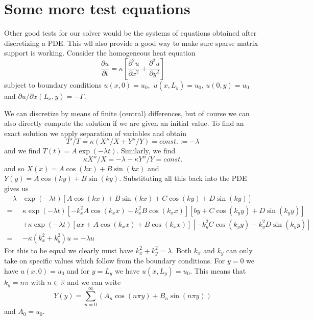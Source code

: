 \documentclass[10pt,a4paper]{article}
\begin{document}
\section{Some more test equations}
Other good tests for our solver would be the systems of equations obtained after discretizing a PDE. This wll also provide a good way to make sure sparse matrix support is working.
Consider the homogeneous heat equation
\begin{equation*}
  \frac{\partial u}{\partial t} = \kappa \left[ \frac{\partial^2u}{\partial x^2} + \frac{\partial^2 u}{\partial y^2}\right]
\end{equation*}
subject to boundary conditions $u(x, 0) = u_0,$ $u(x, L_y)=u_0$, $u(0, y) = u_0$ and $\partial u/\partial x(L_x, y) = -\Gamma.$

We can discretize by means of finite (central) differences, but of course we can also directly compute the solution if we are given an initial value.
To find an exact solution we apply separation of variables and obtain
\begin{equation*}
  T'/T = \kappa (X''/X + Y''/Y) = const. := -\lambda
\end{equation*}
and we find $T(t) = A \exp(-\lambda t).$
Similarly, we find
\begin{equation*}
  \kappa X''/X = -\lambda - \kappa Y''/Y = const.
\end{equation*}
and so $X(x) =  A \cos(kx) + B \sin(kx)$ and $Y(y) = A \cos(ky) + B \sin(ky).$
Substituting all this back into the PDE gives us
\begin{align*}
  -\lambda &\exp(-\lambda t) \left[A\cos(kx) + B\sin(kx) + C\cos(ky) + D\sin(ky)\right] \\
  =&\kappa \exp(-\lambda t) \left[ -k_x^2 A\cos(k_xx)  -k_x^2B\cos(k_xx)\right]\left[by +  C\cos(k_yy) + D\sin(k_yy)\right] \\
           &+ \kappa \exp(-\lambda t) \left[ ax +  A\cos(k_xx)  + B\cos(k_xx)\right]\left[-k_y^2C\cos(k_yy) - k_y^2 D\sin(k_yy)\right] \\
  =& -\kappa (k_x^2  + k_y^2) u = -\lambda u
\end{align*}
For this to be equal we clearly must have $k_x^2  + k_y^2 = \lambda.$
Both $k_x$ and $k_y$ can only take on specific values which follow from the boundary conditions.
For $y=0$ we have $u(x,0) = u_0$ and for $y = L_y$ we have $u(x,L_y) = u_0.$ This means that $k_y= n \pi$ with $n \in \mathbb{R}$ and we can write
\begin{equation*}
  Y(y) = \sum_{n=0}^\infty (A_n\cos(n \pi y) + B_n \sin(n\pi y))
\end{equation*}
and $A_0 = u_0.$
\end{document}
